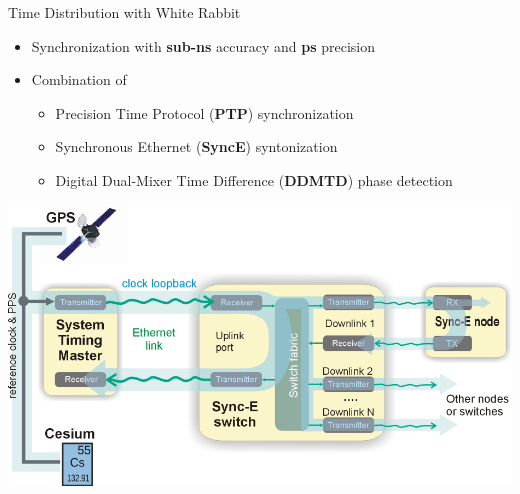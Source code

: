 \documentclass[compress,red]{beamer}
\begin{document}
\begin{frame}{Time Distribution with White Rabbit}

\begin{center}
  \begin{itemize}
    \item Synchronization with {\bf sub-ns} accuracy and {\bf ps} precision
    \item Combination of
	\begin{itemize}\small
	  \item Precision Time Protocol ({\bf PTP}) synchronization
	  \item Synchronous Ethernet ({\bf SyncE}) syntonization
	  \item Digital Dual-Mixer Time Difference ({\bf DDMTD}) phase detection
	\end{itemize}
  \end{itemize}
	\includegraphics[width=.75\textwidth]{misc/synce.pdf}
\end{center}
\end{frame}
\end{document}

